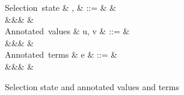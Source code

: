 \begin{figure}[H]
\begin{syntaxfig}
\mbox{Selection state}
&
\alpha, \beta
&
::=
&
\top
&
\\
&&&
\bot
&
\\[2mm]
\mbox{Annotated values}
&
u, v
&
::=
&
\hole \mid \annTrue{\alpha} \mid \annFalse{\alpha} \mid {} \mid \annNil{\alpha} \mid {} \mid 
\\
&&&
  \mid {} \mid {} \mid {}
&
\text{}
\\[2mm]
\mbox{Annotated terms}
&
e
&
::=
&
\hole \mid \annTrue{\alpha} \mid \annFalse{\alpha} \mid {} \mid \annNil{\alpha} \mid {} \mid 
\\
&&&
  \mid {} 
&
\text{}
\\[2mm]
\end{syntaxfig}
\caption{Selection state and annotated values and terms}
\label{fig:core-syntax-selection}
\end{figure}
